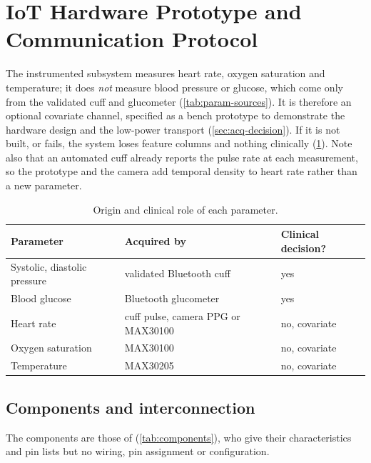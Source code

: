 \section{IoT Hardware Prototype and Communication Protocol}\label{sec:iot}\label{sec:iot-scope}

The instrumented subsystem measures heart rate, oxygen saturation and temperature; it does \emph{not} measure blood pressure or glucose, which come only from the validated cuff and glucometer (\cref{tab:param-sources}). It is therefore an optional covariate channel, specified as a bench prototype to demonstrate the hardware design and the low-power transport (\cref{sec:acq-decision}). If it is not built, or fails, the system loses feature columns and nothing clinically (\cref{tab:parameter-provenance}). Note also that an automated cuff already reports the pulse rate at each measurement, so the prototype and the camera add temporal density to heart rate rather than a new parameter.

\begin{table}[htbp]
\centering\small
\caption{Origin and clinical role of each parameter.}\label{tab:parameter-provenance}
\begin{tabularx}{\textwidth}{@{}>{\raggedright\arraybackslash}p{3.8cm} X >{\raggedright\arraybackslash}p{3.4cm}@{}}
\toprule
\textbf{Parameter} & \textbf{Acquired by} & \textbf{Clinical decision?} \\
\midrule
Systolic, diastolic pressure & validated Bluetooth cuff & yes \\
Blood glucose & Bluetooth glucometer & yes \\
Heart rate & cuff pulse, camera PPG or MAX30100 & no, covariate \\
Oxygen saturation & MAX30100 & no, covariate \\
Temperature & MAX30205 & no, covariate \\
\bottomrule
\end{tabularx}
\end{table}

\subsection{Components and interconnection}\label{sec:components}\label{sec:interconnect}\label{sec:pinout}

The components are those of \textcite{efendi2025} (\cref{tab:components}), who give their characteristics and pin lists but no wiring, pin assignment or configuration.


